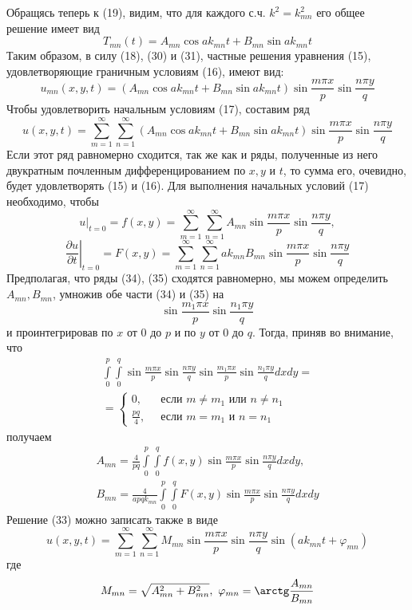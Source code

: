\begin{enumerate}
Обращясь теперь к (19), видим, что для каждого с.ч. $k^2=k_{mn}^2$ его общее решение имеет вид
\[
	T_{mn} (t) = A_{mn} \cos a k_{mn} t + B_{mn} \sin a k_{mn} t \tag{31}
\]
Таким образом, в силу (18), (30) и (31), частные решения уравнения (15), удовлетворяющие граничным условиям (16), имеют вид:
\[
	u_{mn} (x,y,t) = \left( A_{mn} \cos a k_{mn} t + B_{mn} \sin a k_{mn} t\right) \sin \frac{m \pi x}{p} \sin \frac{n \pi y}{q} \tag{32}
\]
Чтобы удовлетворить начальным условиям (17), составим ряд
\[
	u(x,y,t) = \sum_{m=1}^\infty \sum_{n=1}^\infty \left( A_{mn} \cos a k_{mn} t + B_{mn} \sin a k_{mn} t\right) \sin \frac{m \pi x}{p} \sin \frac{n \pi y}{q} \tag{33}
\]
Если этот ряд равномерно сходится, так же как и ряды, полученные из него двукратным почленным дифференцированием по $x, y$ и $t$, то сумма его, очевидно, будет удовлетворять (15) и (16). Для выполнения начальных условий (17) необходимо, чтобы
\[
	\left. u\right|_{t=0} = f(x,y) = \sum_{m=1}^\infty \sum_{n=1}^\infty A_{mn} \sin \frac{m \pi x}{p} \sin \frac{n \pi y}{q}, \tag{34}
\]
\[
	\left. \frac{\partial u}{\partial t}\right|_{t=0} = F(x,y) = \sum_{m=1}^\infty \sum_{n=1}^\infty a k_{mn} B_{mn} \sin \frac{m \pi x}{p} \sin \frac{n \pi y}{q} \tag{35}
\]
Предполагая, что ряды (34), (35) сходятся равномерно, мы можем определить $A_{mn}, B_{mn}$, умножив обе части (34) и (35) на
\[
	\sin \frac{m_1 \pi x}{p} \sin \frac{n_1 \pi y}{q}
\]
и проинтегрировав по $x$ от $0$ до $p$ и по $y$ от $0$ до $q$. Тогда, приняв во внимание, что
\[
	\begin{aligned}
	\int\limits_0^p \int\limits_0^q \sin \frac{m \pi x}{p} \sin \frac{n \pi y}{q} \sin \frac{m_1 \pi x}{p} \sin \frac{n_1 \pi y}{q} dxdy = \\
	= \left\{ \begin{aligned} 0, ~& \text{ если } m\ne m_1 \text{ или } n\ne n_1 \\
	\frac{pq}{4}, ~& \text{ если } m=m_1 \text{ и } n=n_1\end{aligned}\right.
\end{aligned}
\]
получаем
\[
	\begin{aligned}
	A_{mn} = \frac{4}{pq} \int\limits_0^p \int\limits_0^q f(x,y) \sin \frac{m \pi x}{p} \sin \frac{n \pi y}{q} dxdy, \\
	B_{mn} = \frac{4}{a p q k_{mn}} \int\limits_0^p \int\limits_0^q F(x,y) \sin \frac{m \pi x}{p} \sin \frac{n \pi y}{q} dxdy 
\end{aligned} \tag{36}
\]
Решение (33) можно записать также в виде
\[
	u(x,y,t) = \sum_{m=1}^\infty \sum_{n=1}^\infty M_{mn} \sin \frac{m \pi x}{p} \sin \frac{n \pi y}{q} \sin \left( a k_{mn} t + \varphi_{mn}\right) \tag{37}
\]
где
\[
	M_{mn} = \sqrt{A_{mn}^2 + B_{mn}^2}, ~ \varphi_{mn} = \arctg \frac{A_{mn}}{B_{mn}}
\]
\end{enumerate}
